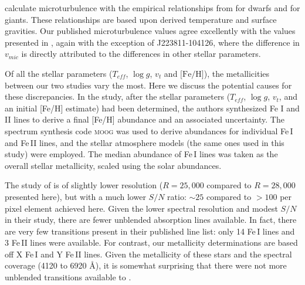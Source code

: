 \documentclass{emulateapj}
\begin{document}
\citet{wylie-de-boer;et-al_2012} calculate microturbulence with the empirical relationships from \citet{Reddy;et-al_2003} for dwarfs and \citet{fulbright_2000} for giants. These relationships are based upon derived temperature and surface gravities. Our published microturbulence values agree excellently with the values presented in \citet{wylie-de-boer;et-al_2012}, again with the exception of J223811-104126, where the difference in $v_{mic}$ is directly attributed to the differences in other stellar parameters.

Of all the stellar parameters ($T_{eff}$, $\log{g}$, $v_{t}$ and $\mbox{[Fe/H]}$), the metallicities between our two studies vary the most. Here we discuss the potential causes for these discrepancies. In the \citet{wylie-de-boer;et-al_2012} study, after the stellar parameters ($T_{eff}$, $\log{g}$, $v_{t}$, and an initial [Fe/H] estimate) had been determined, the authors synthesized Fe \textsc{I} and \textsc{II} lines to derive a final [Fe/H] abundance and an associated uncertainty. The spectrum synthesis code \textsc{moog} was used to derive abundances for individual Fe\,\textsc{I} and Fe\,\textsc{II} lines, and the \citet{castelli;kurucz_2003} stellar atmosphere models (the same ones used in this study) were employed. The median abundance of Fe\,I lines was taken as the overall stellar metallicity, scaled using the \citet{grevesse;sauval_1998} solar abundances.

The study of \citet{wylie-de-boer;et-al_2012} is of slightly lower resolution ($R = 25,000$ compared to $R = 28,000$ presented here), but with a much lower $S/N$ ratio: $\sim{}25$ compared to $>100$ per pixel element achieved here. Given the lower spectral resolution and modest $S/N$ in their study, there are fewer unblended absorption lines available. In fact, there are very few transitions present in their published line list: only 14 Fe\,I lines and 3 Fe\,II lines were available. For contrast, our metallicity determinations are based off X Fe\,I and Y Fe\,II lines. Given the metallicity of these stars and the spectral coverage (4120 to 6920 {\AA}), it is somewhat surprising that there were not more unblended transitions available to \citet{wylie-de-boer;et-al_2012}. 
\end{document}
